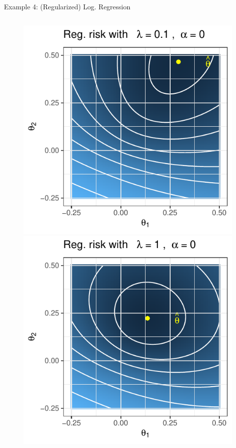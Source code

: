 \documentclass[11pt,compress,t,notes=noshow, xcolor=table]{beamer}
\begin{document}
\begin{vbframe}{Example 4: (Regularized) Log. Regression}
\vspace*{-0.6cm}

\begin{columns}
\begin{column}{.28\textwidth}
\begin{figure}
	\includegraphics{figure_man/logreg-0-0.1.pdf}\\
	\includegraphics{figure_man/logreg-0-1.pdf} 

\end{figure}
\end{column}
\end{columns}
\end{vbframe}
\end{document}
